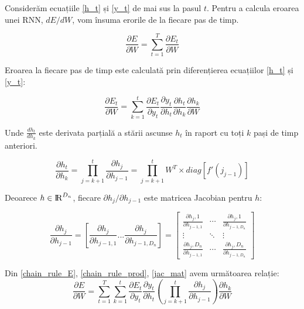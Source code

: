 Considerăm ecuațiile \ref{h_t} și \ref{y_t} de mai sus la pasul $t$. Pentru a calcula eroarea unei RNN, $dE/dW$, vom însuma erorile de la fiecare pas de timp.

\begin{equation}
	\frac{\partial E}{\partial W} = \sum_{t=1}^{T} \frac{\partial E_t}{\partial W}
\end{equation}

Eroarea la fiecare pas de timp este calculată prin diferențierea ecuațiilor  \ref{h_t} și \ref{y_t}:

\begin{equation}
	\frac{\partial E_t}{\partial W} = \sum_{k=1}^{t} \frac{\partial E_t}{\partial y_t} \frac{\partial y_t}{\partial h_t} \frac{\partial h_t}{\partial h_k} \frac{\partial h_k}{\partial W}
	\label{chain_rule_E}
\end{equation}

Unde $\frac{dh_t}{dh_k}$ este derivata parțială a stării ascunse $h_t$ în raport cu toți $k$ pași de timp anteriori.

\begin{equation}
	\frac{\partial h_t}{\partial h_k} = \prod_{j=k+1}^{t} \frac{\partial h_j}{\partial h_{j-1}} = \prod_{j=k+1}^{t} W^T \times diag[f'(j_{j-1})]
	\label{chain_rule_prod}
\end{equation}

Deoarece $h \in {\rm I\!R}^{D_n}$, fiecare $\partial h_j / \partial h_{j-1}$ este matricea Jacobian pentru $h$:

\begin{equation}
	\frac{\partial h_j}{\partial h_{j-1}} = [\frac{\partial h_j}{\partial h_{j-1, 1}} ... \frac{\partial h_j}{\partial h_{j-1,  D_n}}] =\begin{bmatrix}
		\frac{\partial h_j,1}{\partial h_{j-1, 1}} & \cdots & \frac{\partial h_j,1}{\partial h_{j-1,  D_n}}	\\[0.3em]
		\vdots           & \ddots &\vdots	\\[0.3em]
		\frac{\partial h_j,D_n}{\partial h_{j-1, 1}} & \cdots & \frac{\partial h_j,D_n}{\partial h_{j-1, D_n}}
	\end{bmatrix}
	\label{jac_mat}
\end{equation}

Din \ref{chain_rule_E}, \ref{chain_rule_prod}, \ref{jac_mat} avem următoarea relație:
\begin{equation}
	\frac{\partial E}{\partial W} = \sum_{t=1}^{T} \sum_{k=1}^{t} \frac{\partial E_t}{\partial y_t} \frac{\partial y_t}{\partial h_t} (\prod_{j=k+1}^{t} \frac{\partial h_j}{\partial h_{j-1}}) \frac{\partial h_k}{\partial W}
\end{equation}

